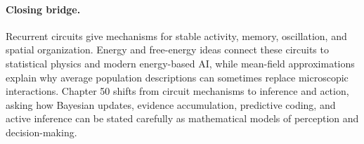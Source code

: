 \paragraph{Closing bridge.}
Recurrent circuits give mechanisms for stable activity, memory, oscillation, and spatial organization. Energy and free-energy ideas connect these circuits to statistical physics and modern energy-based AI, while mean-field approximations explain why average population descriptions can sometimes replace microscopic interactions. Chapter 50 shifts from circuit mechanisms to inference and action, asking how Bayesian updates, evidence accumulation, predictive coding, and active inference can be stated carefully as mathematical models of perception and decision-making.

\clearpage
